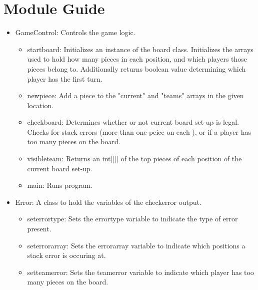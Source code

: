 \documentclass[12pt]{article}
\begin{document}
	\section{Module Guide}
	\begin{itemize}
		   \item GameControl: Controls the game logic.
		   \begin{itemize}
		   	\item startboard: Initializes an instance of the board class. Initializes the arrays used to hold how many pieces in each position, and which players those pieces belong to. Additionally returns boolean value determining which player has the first turn.
		   	\item newpiece: Add a piece to the "current" and "teams" arrays in the given location.
		   	\item checkboard: Determines whether or not current board set-up is legal. Checks for stack errors (more than one peice on each ), or if a player has too many pieces on the board.
		   	\item visibleteam: Returns an int[][] of the top pieces of each position of the current board set-up.
		   	\item main: Runs program.
		   \end{itemize}
		   \item Error: A class to hold the variables of the checkerror output.
		   \begin{itemize}
		   	\item seterrortype: Sets the errortype variable to indicate the type of error present.
		   	\item seterrorarray: Sets the errorarray variable to indicate which positions a stack error is occuring at.
		   	\item setteamerror: Sets the teamerror variable to indicate which player has too many pieces on the board.
		   \end{itemize}
		   

\end{itemize}
\end{document}
